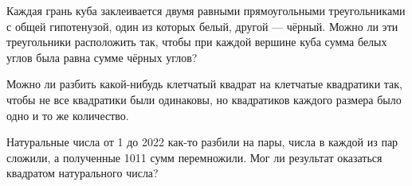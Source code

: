 \documentclass{article}
\begin{document}
\begin{enumerate_boxed}
        \item Каждая грань куба заклеивается двумя равными прямоугольными треугольниками с общей гипотенузой, один из которых белый, другой — чёрный.
        Можно ли эти треугольники расположить так, чтобы при каждой вершине куба сумма белых углов была равна сумме чёрных углов?

        \item Можно ли разбить какой-нибудь клетчатый квадрат на клетчатые квадратики так, чтобы не все квадратики были одинаковы, но квадратиков каждого размера было одно и то же количество.

        \item Натуральные числа от 1 до 2022 как-то разбили на пары, числа в каждой из пар сложили, а полученные 1011 сумм перемножили.
        Мог ли результат оказаться квадратом натурального числа?

    \end{enumerate_boxed}
\end{document}
